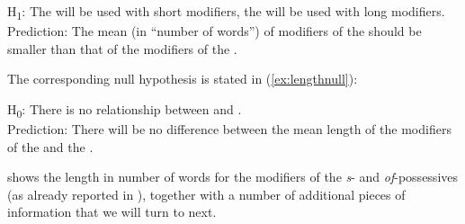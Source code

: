 \begin{exe}
\ex H\textsubscript{1}: The  will be used with short modifiers, the  will be used with long modifiers.\smallskip\\
Prediction: The mean    (in ``number of words'') of modifiers of the   should be smaller than that of the modifiers of the .
\label{ex:lengthalternative}
\end{exe}

The corresponding null hypothesis  is stated in (\ref{ex:lengthnull}):

\begin{exe}
\ex H\textsubscript{0}: There is no relationship between   and . \smallskip\\
Prediction: There will be no difference between the mean  length of the modifiers of the  and the .
\label{ex:lengthnull}
\end{exe}

 shows the length  in number of words for the modifiers of the \textit{s}- and \textit{of}-possessives  (as already reported in ), together with a number of additional pieces of information that we will turn to next.

